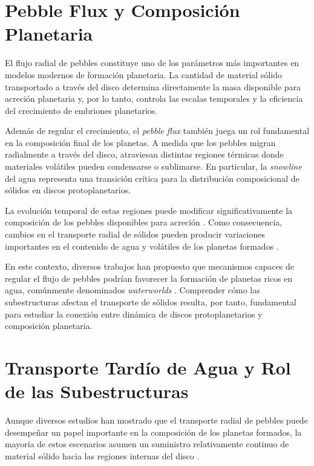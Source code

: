 \section{Pebble Flux y Composición Planetaria}

El flujo radial de pebbles constituye uno de los parámetros más importantes en modelos modernos de formación planetaria. La cantidad de material sólido transportado a través del disco determina directamente la masa disponible para acreción planetaria y, por lo tanto, controla las escalas temporales y la eficiencia del crecimiento de embriones planetarios.

Además de regular el crecimiento, el \textit{pebble flux} también juega un rol fundamental en la composición final de los planetas. A medida que los pebbles migran radialmente a través del disco, atraviesan distintas regiones térmicas donde materiales volátiles pueden condensarse o sublimarse. En particular, la \textit{snowline} del agua representa una transición crítica para la distribución composicional de sólidos en discos protoplanetarios.

La evolución temporal de estas regiones puede modificar significativamente la composición de los pebbles disponibles para acreción \citep{Booth2017, Booth2019}. Como consecuencia, cambios en el transporte radial de sólidos pueden producir variaciones importantes en el contenido de agua y volátiles de los planetas formados \citep{Banzatti2023}.

En este contexto, diversos trabajos han propuesto que mecanismos capaces de regular el flujo de pebbles podrían favorecer la formación de planetas ricos en agua, comúnmente denominados \textit{waterworlds} \citep{McCloat2025, Krijt2025, Bitsch2021, Astrakhantsev2026}. Comprender cómo las subestructuras afectan el transporte de sólidos resulta, por tanto, fundamental para estudiar la conexión entre dinámica de discos protoplanetarios y composición planetaria.


\section{Transporte Tardío de Agua y Rol de las Subestructuras}

Aunque diversos estudios han mostrado que el transporte radial de pebbles puede desempeñar un papel importante en la composición de los planetas formados, la mayoría de estos escenarios asumen un suministro relativamente continuo de material sólido hacia las regiones internas del disco \citep{Appelgren2020, Lau2024}.

